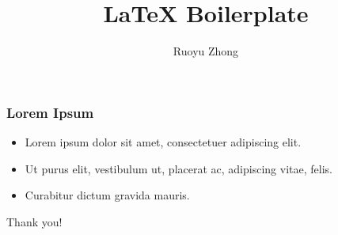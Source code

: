 \documentclass[aspectratio=169]{beamer}
\title{LaTeX Boilerplate}
\author{Ruoyu Zhong}
\date{}
\begin{document}
\begin{frame}
\titlepage
\end{frame}

\begin{frame}
\frametitle{Lorem Ipsum}
\begin{itemize}
\item Lorem ipsum dolor sit amet, consectetuer adipiscing elit.
\pause
\item Ut purus elit, vestibulum ut, placerat ac, adipiscing vitae, felis.
\pause
\item Curabitur dictum gravida mauris.
\end{itemize}
\end{frame}

\begin{frame}[standout]
Thank you!
\end{frame}
\end{document}
